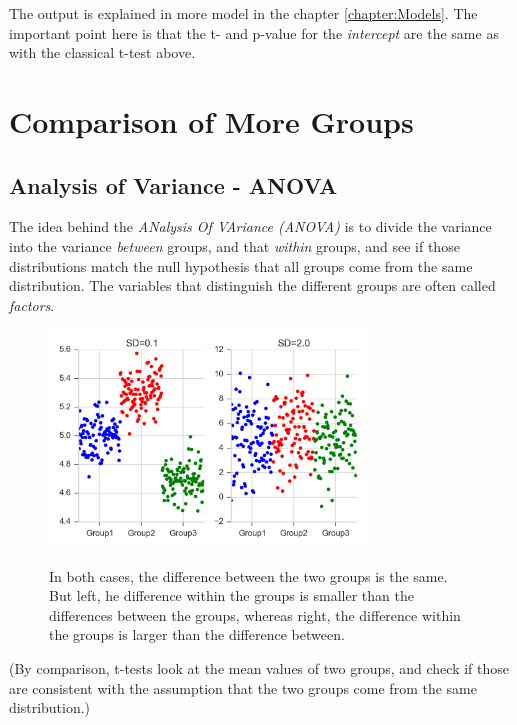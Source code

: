 The output is explained in more model in the chapter \ref{chapter:Models}. The important point here is that the t- and p-value for the \emph{intercept} are the same as with the classical t-test above.

\section{Comparison of More Groups}

\subsection{Analysis of Variance - ANOVA} \label{sec:anova}  

The idea behind the \emph{ANalysis Of VAriance (ANOVA)} is to divide the variance into the variance \emph{between} groups, and that \emph{within} groups, and see if those distributions match the null hypothesis that all groups come from the same distribution. The variables that distinguish the different groups are often called \emph{factors}.

\begin{figure}
  \centering
  \includegraphics[width=0.75\textwidth]{../Images/ANOVA_oneway.png}\\
  \caption{In both cases, the difference between the two groups is the same. But left, he difference within the groups is smaller than the differences between the groups, whereas right, the difference within the groups is larger than the difference between.}\label{fig:ANOVA_oneway}
\end{figure}

(By comparison, t-tests look at the mean values of two groups, and check if those are consistent with the assumption that the two groups come from the same distribution.)

